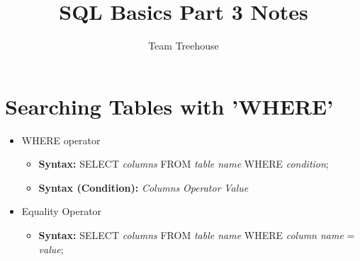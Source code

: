 \documentclass[12pt]{article}
\begin{document}
\title{SQL Basics Part 3 Notes}
\author{Team Treehouse}
\maketitle

\bigskip

\section{Searching Tables with 'WHERE'}

\bigskip

\begin{itemize}
    \item WHERE operator
    \begin{itemize}
        \item \textbf{Syntax:} SELECT \textit{columns} FROM \textit{table name} WHERE \textit{condition};
        \item \textbf{Syntax (Condition):} \textit{Columns} \textit{Operator} \textit{Value}
    \end{itemize}

    \item Equality Operator
    \begin{itemize}
        \item \textbf{Syntax:} SELECT \textit{columns} FROM \textit{table name} WHERE \textit{column name} = \textit{value};
    \end{itemize}
\end{itemize}
\end{document}
